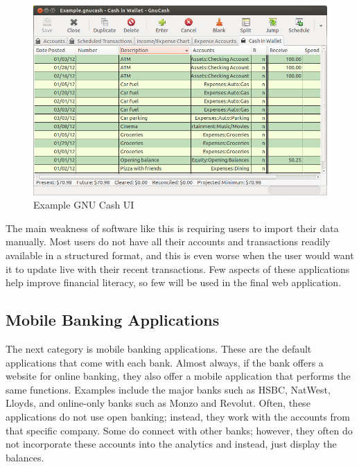 \vspace{2\baselineskip}

\begin{figure}[H]
    \centering
    \includegraphics[width=\textwidth]{images/gnucash.png}
    \caption{Example GNU Cash UI \cite{GNUCashUI}}
    \label{fig:gnucash_ui}
\end{figure}

The main weakness of software like this is requiring users to import their data manually. Most users do not have all their accounts and transactions readily available in a structured format, and this is even worse when the user would want it to update live with their recent transactions. Few aspects of these applications help improve financial literacy, so few will be used in the final web application.

\subsection{Mobile Banking Applications}
\label{sec:mobile-banking-applications}
The next category is mobile banking applications. These are the default applications that come with each bank. Almost always, if the bank offers a website for online banking, they also offer a mobile application that performs the same functions. Examples include the major banks such as HSBC, NatWest, Lloyds, and online-only banks such as Monzo and Revolut. Often, these applications do not use open banking; instead, they work with the accounts from that specific company. Some do connect with other banks; however, they often do not incorporate these accounts into the analytics and instead, just display the balances.

